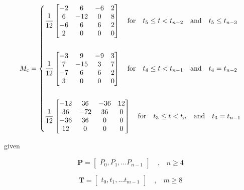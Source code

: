 \documentclass{article}
\begin{document}
    \begin{equation}
        M_c = \begin{dcases} 
            \frac{1}{12} \begin{bmatrix} -2 & 6 & -6 & 2 \\
                                          6 & -12 & 0 & 8 \\
                                         -6 & 6 & 6 & 2 \\
                                          2 & 0 & 0 & 0 \end{bmatrix} \quad \text{for} \quad t_{5} \leq t < t_{n-2} \quad \text{and} \quad t_5 \leq t_{n-3}\\\\
            \frac{1}{12} \begin{bmatrix} -3 & 9 & -9 & 3 \\
                                          7 & -15 & 3 & 7 \\
                                         -7 & 6 & 6 & 2 \\
                                          3 & 0 & 0 & 0 \end{bmatrix} \quad \text{for} \quad t_{4} \leq t < t_{n-1} \quad \text{and} \quad t_4 = t_{n-2}\\\\
            \frac{1}{12} \begin{bmatrix} -12 & 36 & -36 & 12 \\
                                          36 & -72 & 36 & 0 \\
                                         -36 & 36 & 0 & 0 \\
                                          12 & 0 & 0 & 0 \end{bmatrix} \quad \text{for} \quad t_{3} \leq t < t_{n} \quad \text{and} \quad t_3 = t_{n-1}
        \end{dcases}
    \end{equation}
    
given

    \begin{equation}
    \textbf{P} = \begin{bmatrix} P_0, P_1, ... P_{n-1} \end{bmatrix} \quad \text{,} \quad n \geq 4
    \end{equation}
    
    \begin{equation}
        \textbf{T} = \begin{bmatrix} t_0, t_1, ... t_{m-1} \end{bmatrix} \quad \text{,} \quad m \geq 8
    \end{equation}
    
\end{document}
